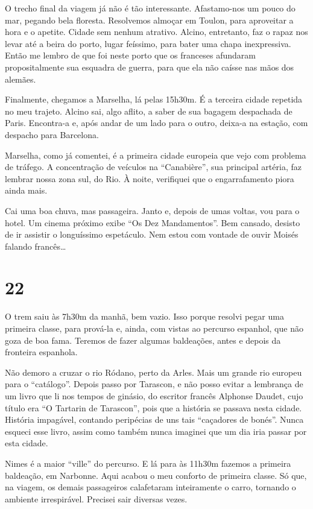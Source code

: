O trecho final da viagem já não é tão interessante. Afastamo-nos um pouco do mar, pegando bela floresta. Resolvemos almoçar em Toulon, para aproveitar a hora e o apetite. Cidade sem nenhum atrativo. Alcino, entretanto, faz o rapaz nos levar até a beira do porto, lugar feíssimo, para bater uma chapa inexpressiva. Então me lembro de que foi neste porto que os franceses afundaram propositalmente sua esquadra de guerra, para que ela não caísse nas mãos dos alemães.

Finalmente, chegamos a Marselha, lá pelas 15h30m. É a terceira cidade repetida no meu trajeto. Alcino sai, algo aflito, a saber de sua bagagem despachada de Paris. Encontra-a e, após andar de um lado para o outro, deixa-a na estação, com despacho para Barcelona.

Marselha, como já comentei, é a primeira cidade europeia que vejo com problema de tráfego. A concentração de veículos na ``Canabière'', sua principal artéria, faz lembrar nossa zona sul, do Rio. À noite, verifiquei que o engarrafamento piora ainda mais.

Cai uma boa chuva, mas passageira. Janto e, depois de umas voltas, vou para o hotel. Um cinema próximo exibe ``Os Dez Mandamentos''. Bem cansado, desisto de ir assistir o longuíssimo espetáculo. Nem estou com vontade de ouvir Moisés falando francês\ldots

\section*{22 \adfflatleafright {}}
O trem saiu às 7h30m da manhã, bem vazio. Isso porque resolvi pegar uma primeira classe, para prová-la e, ainda, com vistas ao percurso espanhol, que não goza de boa fama. Teremos de fazer algumas baldeações, antes e depois da fronteira espanhola.

Não demoro a cruzar o rio Ródano, perto da Arles. Mais um grande rio europeu para o ``catálogo''. Depois passo por Tarascon, e não posso evitar a lembrança de um livro que li nos tempos de ginásio, do escritor francês Alphonse Daudet, cujo título era ``O Tartarin de Tarascon'', pois que a história se passava nesta cidade. História impagável, contando peripécias de uns tais ``caçadores de bonés''. Nunca esqueci esse livro, assim como também nunca imaginei que um dia iria passar por esta cidade.

Nimes é a maior ``ville'' do percurso. E lá para às 11h30m fazemos a primeira baldeação, em Narbonne. Aqui acabou o meu conforto de primeira classe. Só que, na viagem, os demais passageiros calafetaram inteiramente o carro, tornando o ambiente irrespirável. Precisei sair diversas vezes.

